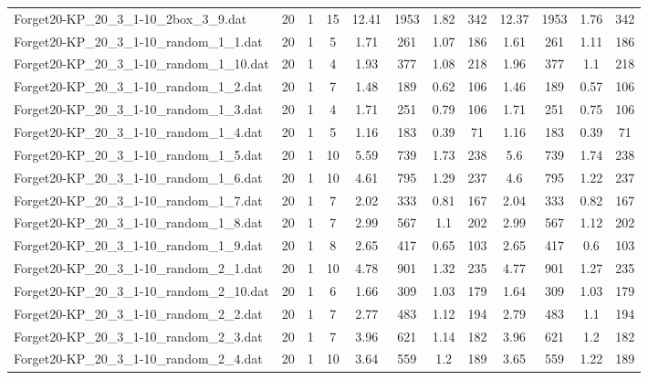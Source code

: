 \begin{sidewaystable}[!ht]
{\begin{tabular}{lccccccccccc}
Forget20-KP\_20\_3\_1-10\_2box\_3\_9.dat & 20 & 1 & 15 & 12.41 & 1953 & 1.82 & 342 & 12.37 & 1953 &  \textcolor{blue2}{1.76} & 342 \\
Forget20-KP\_20\_3\_1-10\_random\_1\_1.dat & 20 & 1 & 5 & 1.71 & 261 &  \textcolor{blue2}{1.07} & 186 & 1.61 & 261 & 1.11 & 186 \\
Forget20-KP\_20\_3\_1-10\_random\_1\_10.dat & 20 & 1 & 4 & 1.93 & 377 &  \textcolor{blue2}{1.08} & 218 & 1.96 & 377 & 1.1 & 218 \\
Forget20-KP\_20\_3\_1-10\_random\_1\_2.dat & 20 & 1 & 7 & 1.48 & 189 & 0.62 & 106 & 1.46 & 189 &  \textcolor{blue2}{0.57} & 106 \\
Forget20-KP\_20\_3\_1-10\_random\_1\_3.dat & 20 & 1 & 4 & 1.71 & 251 & 0.79 & 106 & 1.71 & 251 & 0.75 & 106 \\
Forget20-KP\_20\_3\_1-10\_random\_1\_4.dat & 20 & 1 & 5 & 1.16 & 183 &  \textcolor{blue2}{0.39} & 71 & 1.16 & 183 &  \textcolor{blue2}{0.39} & 71 \\
Forget20-KP\_20\_3\_1-10\_random\_1\_5.dat & 20 & 1 & 10 & 5.59 & 739 &  \textcolor{blue2}{1.73} & 238 & 5.6 & 739 & 1.74 & 238 \\
Forget20-KP\_20\_3\_1-10\_random\_1\_6.dat & 20 & 1 & 10 & 4.61 & 795 & 1.29 & 237 & 4.6 & 795 &  \textcolor{blue2}{1.22} & 237 \\
Forget20-KP\_20\_3\_1-10\_random\_1\_7.dat & 20 & 1 & 7 & 2.02 & 333 &  \textcolor{blue2}{0.81} & 167 & 2.04 & 333 & 0.82 & 167 \\
Forget20-KP\_20\_3\_1-10\_random\_1\_8.dat & 20 & 1 & 7 & 2.99 & 567 &  \textcolor{blue2}{1.1} & 202 & 2.99 & 567 & 1.12 & 202 \\
Forget20-KP\_20\_3\_1-10\_random\_1\_9.dat & 20 & 1 & 8 & 2.65 & 417 & 0.65 & 103 & 2.65 & 417 &  \textcolor{blue2}{0.6} & 103 \\
Forget20-KP\_20\_3\_1-10\_random\_2\_1.dat & 20 & 1 & 10 & 4.78 & 901 & 1.32 & 235 & 4.77 & 901 &  \textcolor{blue2}{1.27} & 235 \\
Forget20-KP\_20\_3\_1-10\_random\_2\_10.dat & 20 & 1 & 6 & 1.66 & 309 &  \textcolor{blue2}{1.03} & 179 & 1.64 & 309 &  \textcolor{blue2}{1.03} & 179 \\
Forget20-KP\_20\_3\_1-10\_random\_2\_2.dat & 20 & 1 & 7 & 2.77 & 483 & 1.12 & 194 & 2.79 & 483 &  \textcolor{blue2}{1.1} & 194 \\
Forget20-KP\_20\_3\_1-10\_random\_2\_3.dat & 20 & 1 & 7 & 3.96 & 621 &  \textcolor{blue2}{1.14} & 182 & 3.96 & 621 & 1.2 & 182 \\
Forget20-KP\_20\_3\_1-10\_random\_2\_4.dat & 20 & 1 & 10 & 3.64 & 559 & 1.2 & 189 & 3.65 & 559 & 1.22 & 189 \\

\end{tabular}}
\end{sidewaystable}
